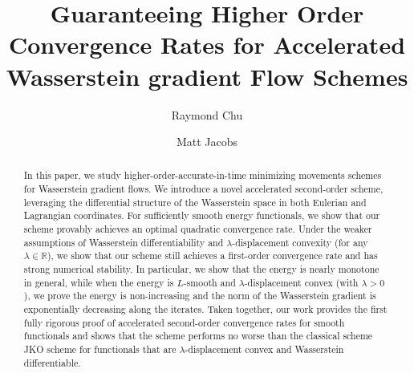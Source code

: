 \documentclass[11pt,a4paper]{amsart}
\newcommand{\1}{\mathds{1}}
\newcommand{\R}{{\mathbb R}}
\numberwithin{equation}{section}
\begin{document}
\title[Accelerated Wasserstein Gradient Flows
]{Guaranteeing Higher Order Convergence Rates for Accelerated Wasserstein gradient Flow Schemes}

\author{Raymond Chu}
\address{Department of Mathematical Sciences, Carnegie Mellon University,
Pittsburgh, PA 15213, USA}

\author{Matt Jacobs}
\address{Department of Mathematics, University of California, Santa Barbara,
CA 93106, USA}



\begin{abstract} 
In this paper, we study higher-order-accurate-in-time minimizing movements schemes for Wasserstein gradient flows.  We introduce a novel accelerated 
second-order scheme, leveraging the differential structure of the Wasserstein space in both Eulerian and Lagrangian coordinates. For sufficiently smooth energy functionals, we show that our scheme provably achieves an optimal quadratic convergence rate. Under the weaker assumptions of Wasserstein differentiability and $\lambda$-displacement convexity (for any $\lambda\in \R$), we show that our scheme still achieves a first-order convergence rate and has strong numerical stability. In particular, we show that the energy is nearly monotone in general, while when the energy is $L$-smooth and $\lambda$-displacement convex (with $\lambda>0$), we prove the energy is non-increasing and the norm of the Wasserstein gradient is exponentially decreasing along the iterates.  Taken together, our work provides the first fully rigorous proof of accelerated second-order convergence rates for smooth functionals and shows that the scheme performs no worse than the classical scheme JKO scheme for functionals that are $\lambda$-displacement convex and Wasserstein differentiable.
\end{abstract}


\maketitle 

\end{document}
